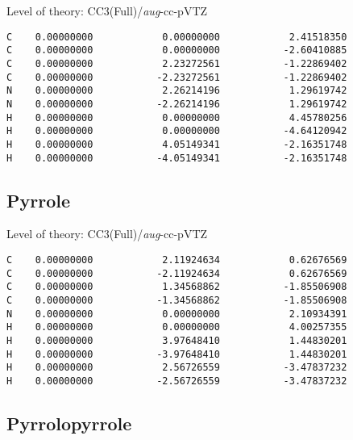 \documentclass[journal=jctcce,manuscript=article,layout=traditional]{achemso}
\newcommand{\AVTZ}{\emph{aug}-cc-pVTZ}
\begin{document}
\begin{singlespace}
Level of theory: CC3(Full)/{\AVTZ}
\begin{verbatim}
C    0.00000000            0.00000000            2.41518350
C    0.00000000            0.00000000           -2.60410885
C    0.00000000            2.23272561           -1.22869402
C    0.00000000           -2.23272561           -1.22869402
N    0.00000000            2.26214196            1.29619742
N    0.00000000           -2.26214196            1.29619742
H    0.00000000            0.00000000            4.45780256
H    0.00000000            0.00000000           -4.64120942
H    0.00000000            4.05149341           -2.16351748
H    0.00000000           -4.05149341           -2.16351748
\end{verbatim}
\end{singlespace}

\subsection*{Pyrrole}

\begin{singlespace}
Level of theory: CC3(Full)/{\AVTZ}
\begin{verbatim}
C    0.00000000            2.11924634            0.62676569
C    0.00000000           -2.11924634            0.62676569
C    0.00000000            1.34568862           -1.85506908
C    0.00000000           -1.34568862           -1.85506908
N    0.00000000            0.00000000            2.10934391
H    0.00000000            0.00000000            4.00257355
H    0.00000000            3.97648410            1.44830201
H    0.00000000           -3.97648410            1.44830201
H    0.00000000            2.56726559           -3.47837232
H    0.00000000           -2.56726559           -3.47837232
\end{verbatim}
\end{singlespace}

\subsection*{Pyrrolopyrrole}
\end{document}
